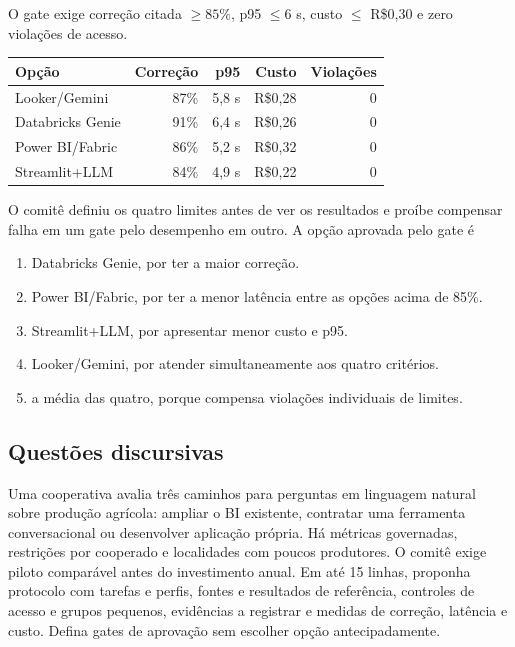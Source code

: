 \TextoBase
O gate exige correção citada $\geq85\%$, p95 $\leq6$ s, custo $\leq$ R\$0,30 e zero violações de acesso.
\begin{center}\small
\begin{tabularx}{\textwidth}{@{}Yrrrr@{}}\toprule
\textbf{Opção} & \textbf{Correção} & \textbf{p95} & \textbf{Custo} & \textbf{Violações}\\\midrule
Looker/Gemini & 87\% & 5,8 s & R\$0,28 & 0\\
Databricks Genie & 91\% & 6,4 s & R\$0,26 & 0\\
Power BI/Fabric & 86\% & 5,2 s & R\$0,32 & 0\\
Streamlit+LLM & 84\% & 4,9 s & R\$0,22 & 0\\\bottomrule
\end{tabularx}\end{center}
\FonteDidatica
O comitê definiu os quatro limites antes de ver os resultados e proíbe compensar falha em um gate pelo desempenho em outro.
\Comando A opção aprovada pelo gate é
\begin{enumerate}[label=\Alph*)]
\item Databricks Genie, por ter a maior correção.
\item Power BI/Fabric, por ter a menor latência entre as opções acima de 85\%.
\item Streamlit+LLM, por apresentar menor custo e p95.
\item Looker/Gemini, por atender simultaneamente aos quatro critérios.
\item a média das quatro, porque compensa violações individuais de limites.
\end{enumerate}

\subsection{Questões discursivas}

\TextoBase
Uma cooperativa avalia três caminhos para perguntas em linguagem natural sobre produção agrícola: ampliar o BI existente, contratar uma ferramenta conversacional ou desenvolver aplicação própria. Há métricas governadas, restrições por cooperado e localidades com poucos produtores. O comitê exige piloto comparável antes do investimento anual.
\FonteDidatica
\Comando Em até 15 linhas, proponha protocolo com tarefas e perfis, fontes e resultados de referência, controles de acesso e grupos pequenos, evidências a registrar e medidas de correção, latência e custo. Defina gates de aprovação sem escolher opção antecipadamente.

